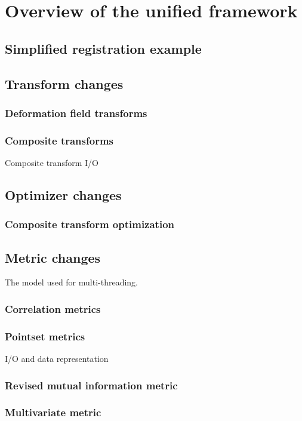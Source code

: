 \documentclass{article}
\begin{document}
\section{Overview of the unified framework}

\subsection{Simplified registration example}

\subsection{Transform changes}
\subsubsection{Deformation field transforms}
\subsubsection{Composite transforms}
Composite transform I/O

\subsection{Optimizer changes}
\subsubsection{Composite transform optimization}

\subsection{Metric changes}
The model used for multi-threading. 
\subsubsection{Correlation metrics}
\subsubsection{Pointset metrics}
I/O and data representation
\subsubsection{Revised mutual information metric}
\subsubsection{Multivariate metric}
\end{document}
